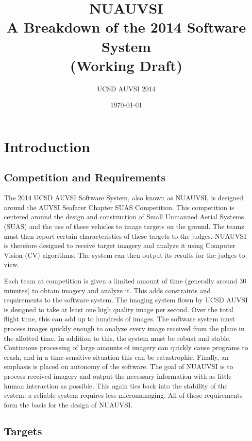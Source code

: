 \documentclass{article}
\title{NUAUVSI \\ \large A Breakdown of the 2014 Software System \\ (Working Draft)}
\author{UCSD AUVSI 2014}
\date{\today}
\begin{document}
\begin{titlepage}
	\maketitle
	\thispagestyle{empty}
\end{titlepage}

\newpage
	\tableofcontents
\newpage
{}

\section{Introduction}
\subsection{Competition and Requirements}

The 2014 UCSD AUVSI Software System, also known as NUAUVSI, is designed around the AUVSI Seafarer Chapter SUAS Competition. This competition is centered around the design and construction of Small Unmanned Aerial Systems (SUAS) and the use of these vehicles to image targets on the ground. The teams must then report certain characteristics of these targets to the judges. NUAUVSI is therefore designed to receive target imagery and analyze it using Computer Vision (CV) algorithms. The system can then output its results for the judges to view. 

Each team at competition is given a limited amount of time (generally around 30 minutes) to obtain imagery and analyze it. This adds constraints and requirements to the software system. The imaging system flown by UCSD AUVSI is designed to take at least one high quality image per second. Over the total flight time, this can add up to hundreds of images. The software system must process images quickly enough to analyze every image received from the plane in the allotted time. In addition to this, the system must be robust and stable. Continuous processing of large amounts of imagery can quickly cause programs to crash, and in a time-sensitive situation this can be catastrophic. Finally, an emphasis is placed on autonomy of the software. The goal of NUAUVSI is to process received imagery and output the necessary information with as little human interaction as possible. This again ties back into the stability of the system: a reliable system requires less micromanaging. All of these requirements form the basis for the design of NUAUVSI.

\subsection{Targets}
\end{document}
